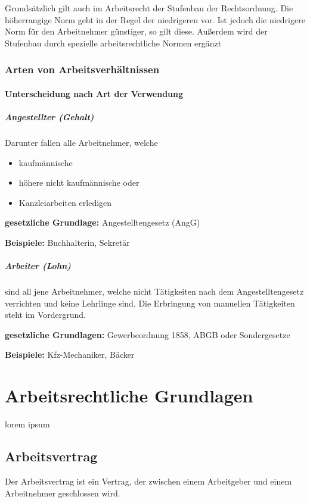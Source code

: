 \documentclass{htblagkr}
\begin{document}
    Grundsätzlich gilt auch im Arbeitsrecht der Stufenbau der Rechtsordnung.
    Die höherrangige Norm geht in der Regel der niedrigeren vor.
    Ist jedoch die niedrigere Norm für den Arbeitnehmer günstiger, so gilt diese.
    Außerdem wird der Stufenbau durch spezielle arbeitsrechtliche Normen ergänzt

    \subsubsection{Arten von Arbeitsverhältnissen}

    \paragraph{Unterscheidung nach Art der Verwendung}

    \subparagraph{Angestellter (Gehalt)}

    Darunter fallen alle Arbeitnehmer, welche

    \begin{itemize}
        \item{kaufmännische}
        \item{höhere nicht kaufmännische oder}
        \item{Kanzleiarbeiten erledigen}
    \end{itemize}

    \textbf{gesetzliche Grundlage:} Angestelltengesetz (AngG)

    \textbf{Beispiele:} Buchhalterin, Sekretär

    \subparagraph{Arbeiter (Lohn)}

    sind all jene Arbeitnehmer, welche nicht Tätigkeiten nach dem Angestelltengesetz verrichten und keine Lehrlinge sind.
    Die Erbringung von manuellen Tätigkeiten steht im Vordergrund.

    \textbf{gesetzliche Grundlagen:} Gewerbeordnung 1858, ABGB oder Sondergesetze

    \textbf{Beispiele:} Kfz-Mechaniker, Bäcker

    \section{Arbeitsrechtliche Grundlagen}

    lorem ipsum

    \subsection{Arbeitsvertrag}

    Der Arbeitsvertrag ist ein Vertrag, der zwischen einem Arbeitgeber und einem Arbeitnehmer geschlossen wird.

    \clearpage

    \listoffigures

    \clearpage

    \printabbreviations

    \clearpage

    \printglossary

    \clearpage

    \printbibliography
\end{document}
